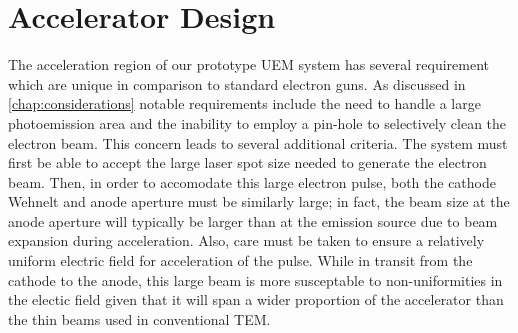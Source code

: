 
\section{Accelerator Design} \label{sec:gun_design}

The acceleration region of our prototype UEM system has several requirement which are unique in comparison to standard electron guns.
As discussed in \ref{chap:considerations} notable requirements include the need to handle a large photoemission area and the inability to employ a pin-hole to selectively clean the electron beam.
This concern leads to several additional criteria.
The system must first be able to accept the large laser spot size needed to generate the electron beam.
Then, in order to accomodate this large electron pulse, both the cathode Wehnelt and anode aperture must be similarly large; in fact, the beam size at the anode aperture will typically be larger than at the emission source due to beam expansion during acceleration.
Also, care must be taken to ensure a relatively uniform electric field for acceleration of the pulse.
While in transit from the cathode to the anode, this large beam is more susceptable to non-uniformities in the electic field given that it will span a wider proportion of the accelerator than the thin beams used in conventional TEM.

